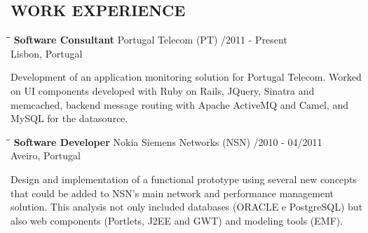 \documentclass{res}
\begin{document}
                               				         
\address{\bf  PRESENT ADDRESS\\Places and stuff\\cities and the like\\(351) 55
555 555} \address{\bf PERMANENT ADDRESS\\Home town\\ home city\\  (351) 55 555
5555}
                               				               
\begin{resume}

\section{WORK EXPERIENCE}

\vspace{-0.1in}
\begin{tabbing}
\hspace{2.3in}\= \hspace{2.6in}\= \kill %
{\bf Software Consultant} \>Portugal Telecom (PT)     /2011 - Present\\
\>Lisbon, Portugal
\end{tabbing}\vspace{-20pt}      %
Development of an application monitoring solution for Portugal Telecom.
Worked on UI components developed with Ruby on Rails, JQuery, Sinatra and memcached, backend message routing with Apache ActiveMQ and Camel, and MySQL for the datasource.

\begin{tabbing}
\hspace{2.3in}\= \hspace{2.6in}\= \kill %
{\bf Software Developer} \>Nokia Siemens Networks (NSN)    
/2010 - 04/2011\\ \>Aveiro, Portugal
\end{tabbing}\vspace{-20pt}      %
Design and implementation of a functional prototype using several new concepts that could be added to NSN's main network and performance management solution.
This analysis not only included databases (ORACLE e PostgreSQL) but also web components (Portlets, J2EE and GWT) and modeling tools (EMF).


\end{resume}
\end{document}
